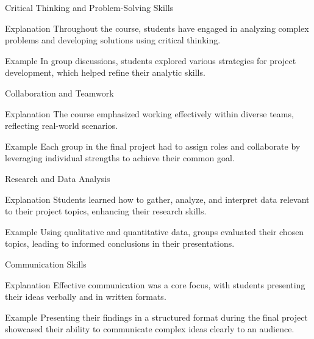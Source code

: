 \documentclass[aspectratio=169]{beamer}
\begin{document}
\begin{frame}[fragile]{Critical Thinking and Problem-Solving Skills}
    \begin{block}{Explanation}
        Throughout the course, students have engaged in analyzing complex problems and developing solutions using critical thinking.
    \end{block}
    \begin{block}{Example}
        In group discussions, students explored various strategies for project development, which helped refine their analytic skills.
    \end{block}
\end{frame}

\begin{frame}[fragile]{Collaboration and Teamwork}
    \begin{block}{Explanation}
        The course emphasized working effectively within diverse teams, reflecting real-world scenarios.
    \end{block}
    \begin{block}{Example}
        Each group in the final project had to assign roles and collaborate by leveraging individual strengths to achieve their common goal.
    \end{block}
\end{frame}

\begin{frame}[fragile]{Research and Data Analysis}
    \begin{block}{Explanation}
        Students learned how to gather, analyze, and interpret data relevant to their project topics, enhancing their research skills.
    \end{block}
    \begin{block}{Example}
        Using qualitative and quantitative data, groups evaluated their chosen topics, leading to informed conclusions in their presentations.
    \end{block}
\end{frame}

\begin{frame}[fragile]{Communication Skills}
    \begin{block}{Explanation}
        Effective communication was a core focus, with students presenting their ideas verbally and in written formats.
    \end{block}
    \begin{block}{Example}
        Presenting their findings in a structured format during the final project showcased their ability to communicate complex ideas clearly to an audience.
    \end{block}
\end{frame}
\end{document}
